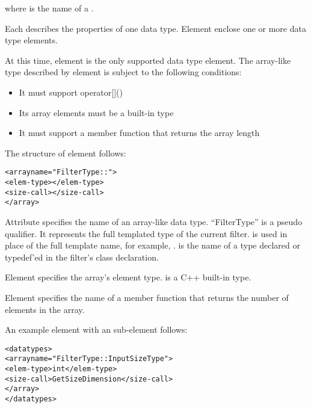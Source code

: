 where  is the name of a .  

Each 
describes the properties of one data type.  Element
 enclose one or more data type elements.

At this time, element  is the only supported data
type element.  The array-like type described by element
 is subject to the following conditions:

\begin{itemize}
\item It must support operator[]()
\item Its array elements must be a built-in type
\item It must support a member function that returns the array length
\end{itemize}

The structure of element  follows:

\begin{alltt}
  <array name="FilterType::">
    <elem-type></elem-type>
    <size-call></size-call>
  </array>
\end{alltt}

Attribute  specifies the name of an array-like
data type.  ``FilterType'' is a pseudo qualifier.  It represents the
full templated type of the current filter.   is
used in place of the full template name, for example, 
.
 is the name of a type declared or
typedef'ed in the filter's class declaration.

Element  specifies the array's element type.
 is a C++ built-in type.

Element  specifies the name of a member
function that returns the number of elements in the array.

An example  element with an 
sub-element follows:

\begin{alltt}
  <datatypes>
    <array name="FilterType::InputSizeType">
      <elem-type>int</elem-type>
      <size-call>GetSizeDimension</size-call>
    </array>
  </datatypes>
\end{alltt}

